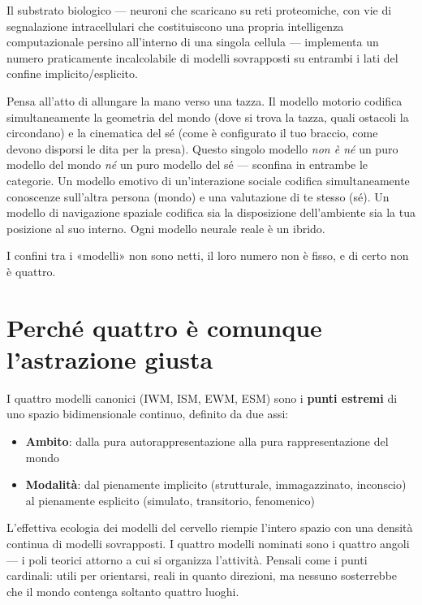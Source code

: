 \documentclass[11pt, twoside, openright]{book}
\begin{document}
Il substrato biologico --- neuroni che scaricano su reti proteomiche, con vie di segnalazione intracellulari che costituiscono una propria intelligenza computazionale persino all'interno di una singola cellula --- implementa un numero praticamente incalcolabile di modelli sovrapposti su entrambi i lati del confine implicito/\allowbreak{}esplicito.

Pensa all'atto di allungare la mano verso una tazza. Il modello motorio codifica simultaneamente la geometria del mondo (dove si trova la tazza, quali ostacoli la circondano) e la cinematica del sé (come è configurato il tuo braccio, come devono disporsi le dita per la presa). Questo singolo modello \textit{non è né} un puro modello del mondo \textit{né} un puro modello del sé --- sconfina in entrambe le categorie. Un modello emotivo di un'interazione sociale codifica simultaneamente conoscenze sull'altra persona (mondo) e una valutazione di te stesso (sé). Un modello di navigazione spaziale codifica sia la disposizione dell'ambiente sia la tua posizione al suo interno. Ogni modello neurale reale è un ibrido.

I confini tra i «modelli» non sono netti, il loro numero non è fisso, e di certo non è quattro.

\section*{Perché quattro è comunque l'astrazione giusta}

I quattro modelli canonici (IWM, ISM, EWM, ESM) sono i \textbf{punti estremi} di uno spazio bidimensionale continuo, definito da due assi:

\begin{itemize}
  \item \textbf{Ambito}: dalla pura autorappresentazione alla pura rappresentazione del mondo
  \item \textbf{Modalità}: dal pienamente implicito (strutturale, immagazzinato, inconscio) al pienamente esplicito (simulato, transitorio, fenomenico)
\end{itemize}

L'effettiva ecologia dei modelli del cervello riempie l'intero spazio con una densità continua di modelli sovrapposti. I quattro modelli nominati sono i quattro angoli --- i poli teorici attorno a cui si organizza l'attività. Pensali come i punti cardinali: utili per orientarsi, reali in quanto direzioni, ma nessuno sosterrebbe che il mondo contenga soltanto quattro luoghi.
\end{document}

